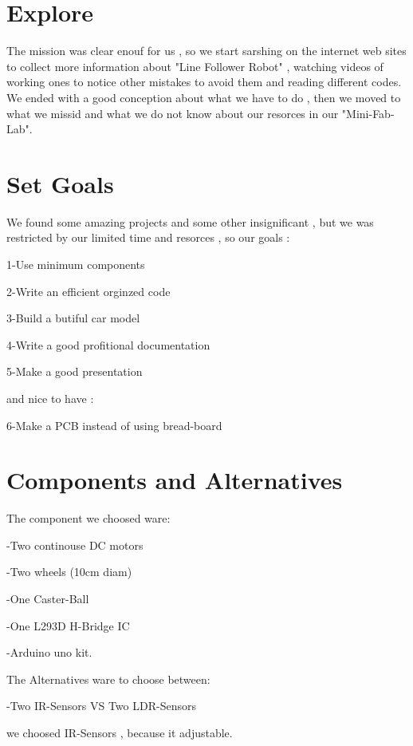 \documentclass[11pt]{report}
\begin{document}
		\section{\textbf{Explore	}} 
		 
		The mission was clear enouf for us , so we start sarshing on the internet web sites to collect more information about "Line Follower Robot" , watching videos of working ones to notice other mistakes to avoid them and reading different codes.
		We ended with a good conception about what we have to do , then we moved to what we missid and what we do not know about  our resorces in our "Mini-Fab-Lab".
		
		\newpage
		\section{\textbf{Set Goals}}  
		
		We found some amazing projects and some other insignificant , but we was restricted by our limited time and resorces , so our goals :
		
		1-Use minimum components
		
		2-Write an efficient orginzed code
		
		3-Build a butiful car model
		
		4-Write a good profitional documentation
		
		5-Make a good  presentation
		
		and nice to have :
		
		6-Make a PCB instead of using bread-board
		
		\newpage 
		\section{\textbf{Components and Alternatives}} 
		
		The component we choosed ware:
		
		-Two continouse DC motors 
		
		-Two wheels (10cm diam)
		
		-One Caster-Ball
		
		-One L293D H-Bridge IC
		
		-Arduino uno kit.
		
		
		The Alternatives ware to choose between:
		
		-Two IR-Sensors VS Two LDR-Sensors
		
		we choosed IR-Sensors , because it adjustable.
		
\end{document}

